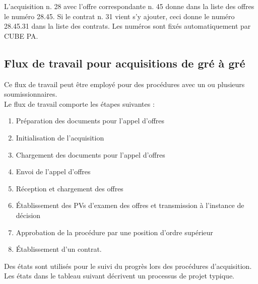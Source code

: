 L'acquisition n. 28 avec l'offre correspondante n. 45 donne dans la liste des offres le numéro 28.45. Si le contrat n. 31 vient s'y ajouter, ceci donne le numéro 28.45.31 dans la liste des contrats. Les numéros sont fixés automatiquement par CUBE PA.

\subsection{Flux de travail pour acquisitions de gré à gré}

Ce flux de travail peut être employé pour des procédures avec un ou plusieurs soumissionnaires. \\
Le flux de travail comporte les étapes suivantes :

\begin{enumerate}
\item Préparation des documents pour l'appel d'offres
\item Initialisation de l'acquisition
\item Chargement des documents pour l'appel d'offres
\item Envoi de l'appel d'offres
\item Réception et chargement des offres
\item Établissement des PVs d'examen des offres et transmission à l'instance de décision
\item Approbation de la procédure par une position d'ordre supérieur
\item Établissement d'un contrat.
\end{enumerate}

Des états sont utilisés pour le suivi du progrès lors des procédures d'acquisition. Les états dans le tableau suivant décrivent un processus de projet typique.

\vspace{\baselineskip}


